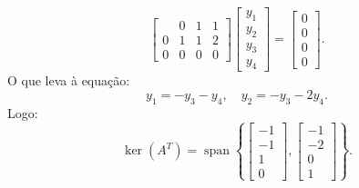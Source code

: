 \begin{resolution}
\begin{enumerate}[label=\alph*)]
\[\begin{bmatrix}
                & 0 & 1 & 1 \\
              0 & 1 & 1 & 2 \\
              0 & 0 & 0 & 0
            \end{bmatrix}
            \begin{bmatrix}
              y_1 \\ y_2 \\ y_3 \\ y_4
            \end{bmatrix} =
            \begin{bmatrix}
              0 \\ 0 \\ 0 \\ 0
            \end{bmatrix}.
          \]
          O que leva à equação:
          \[
            y_1 = -y_3 - y_4, \quad y_2 = -y_3 - 2y_4.
          \]
          Logo:
          \[
            \operatorname{ker}(A^T) = \operatorname{span}\left\{
            \begin{bmatrix} -1 \\ -1 \\ 1 \\ 0 \end{bmatrix},
            \begin{bmatrix} -1 \\ -2 \\ 0 \\ 1 \end{bmatrix}
            \right\}.
          \]
  \end{enumerate}
\end{resolution}


